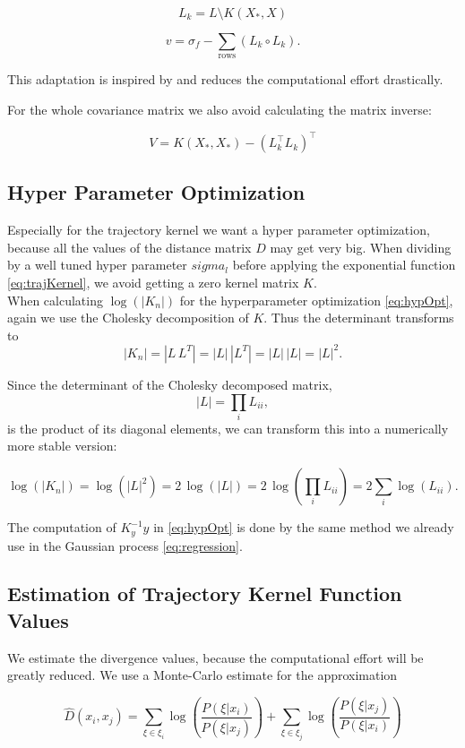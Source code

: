 $$L_k = L \setminus K(X_*,X)$$

$$v = \sigma_f - \sum_{\text{rows}} (L_k \circ L_k).$$

This adaptation is inspired by \cite{nandoCode} and reduces the computational effort drastically.

For the whole covariance matrix we also avoid calculating the matrix inverse:

$$V = K(X_*,X_*) - (L_k^\top L_k)^\top $$

\subsection{Hyper Parameter Optimization}
Especially for the trajectory kernel we want a hyper parameter optimization, because all the values of the distance matrix $D$ may get very big. When dividing by a well tuned hyper parameter $sigma_l$ before applying the exponential function \eqref{eq:trajKernel}, we avoid getting a zero kernel matrix $K$.\\

When calculating $\log(|K_n|)$ for the hyperparameter optimization \eqref{eq:hypOpt}, again we use the Cholesky decomposition of $K$. Thus the determinant transforms to
$$|K_n|=|L\,L^{T}|=|L|\,|L^{T}|=|L|\,|L|=|L|^{2}.$$

Since the determinant of the Cholesky decomposed matrix,
$$|L| = \textstyle\prod_{i} L_{ii},$$
is the product of its diagonal elements, we can transform this into a numerically more stable version:

$$\log(|K_n|) = \log(|L|^{2}) = 2\,\log(|L|) = 2\,\log(\textstyle\prod_{i} L_{ii}) = 2\textstyle\sum_{i} \log(L_{ii}).$$

The computation of $K_y^{-1}y$ in \eqref{eq:hypOpt} is done by the same method we already use in the Gaussian process \eqref{eq:regression}.

\subsection{Estimation of Trajectory Kernel Function Values}

We estimate the divergence values, because the computational effort will be greatly reduced\cite{wilson2014using}. We use a Monte-Carlo estimate for the approximation

$$\hat{D}(x_{ i }, x_{ j }) = \sum _{\xi \in \xi_i} \log\left( \frac{P(\xi|x_{ i })}{P(\xi|x_{ j })} \right) + \sum _{\xi \in \xi_j} \log\left( \frac{P(\xi|x_{ j })}{P(\xi|x_{ i })} \right) $$

